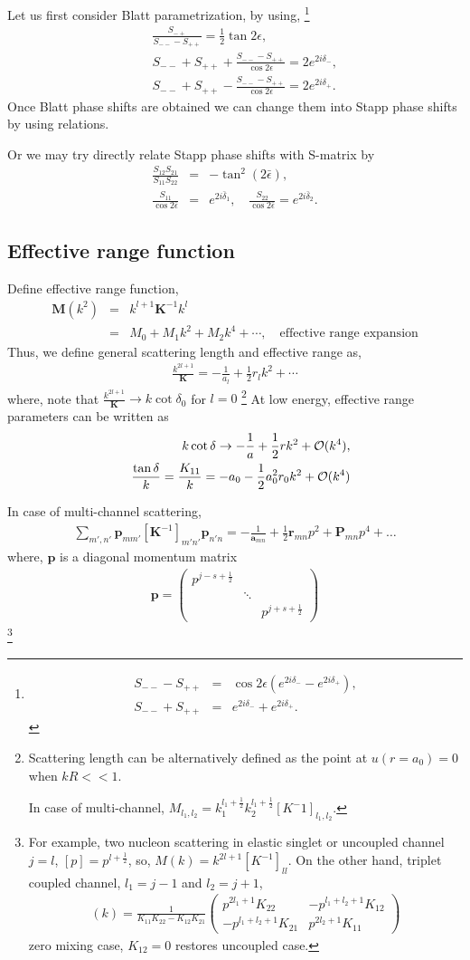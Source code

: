 \documentclass[10pt]{book}
\def\bm{\boldsymbol}
\newcommand{\bea}{\begin{eqnarray}}
\newcommand{\eea}{\end{eqnarray}}
\newcommand{\no}{\nonumber \\}
\def\vp{{\bm p}}
\begin{document}
Let us first consider Blatt parametrization,
 by using, \footnote{  
\bea 
S_{--}-S_{++}&=&\cos 2\epsilon (e^{2i\delta_{-}}-e^{2i\delta_{+}}),\no  
S_{--}+S_{++}&=& e^{2i\delta_{-}}+e^{2i\delta_{+}}.
\eea 
}
\bea 
& &\frac{S_{-+}}{S_{--}-S_{++}}=\frac{1}{2}\tan 2\epsilon,\no 
& & S_{--}+S_{++}+\frac{S_{--}-S_{++}}{\cos 2\epsilon}=2e^{2i\delta_{-}},\no 
& & S_{--}+S_{++}-\frac{S_{--}-S_{++}}{\cos 2\epsilon}=2e^{2i\delta_{+}}.
\eea  
Once Blatt phase shifts are obtained we can change them into Stapp phase shifts
by using relations. 

Or we may try directly relate Stapp phase shifts with S-matrix by 
\bea 
\frac{S_{12}S_{21}}{S_{11}S_{22}}&=& -\tan^2(2\bar{\epsilon}), \no 
\frac{S_{11}}{\cos 2\bar{\epsilon}}&=& e^{2i\bar{\delta}_1},\quad 
\frac{S_{22}}{\cos 2\bar{\epsilon}}= e^{2i\bar{\delta}_2}.
\eea 

\subsection{Effective range function}
Define effective range function,
\bea
{\bm M}(k^2)&=&k^{l+1}{\bm K}^{-1} k^{l} \no
  &=& M_0+M_1 k^2+M_2 k^4+\cdots,\quad\mbox{effective range expansion}
\eea
Thus, we define general scattering length and effective range as,
\bea
\frac{k^{2l+1}}{\bm K}=-\frac{1}{a_l}+\frac{1}{2}r_l k^2+\cdots
\eea
where, note that $\frac{k^{2l+1}}{\bm K}\to k\cot\delta_0$ for $l=0$
\footnote{ Scattering length can be alternatively defined as the point at $u(r=a_0)=0$ when $kR<<1$.

In case of multi-channel, $M_{l_1,l_2}=k_1^{l_1+\frac{1}{2}}k_2^{l_1+\frac{1}{2}}[K^-1]_{l_1,l_2}$.
}
At low energy, effective range parameters 
can be written as
\bea
& &k\cot\delta\to -\frac{1}{a}+\frac{1}{2} r k^2+{\cal O}(k^4),\no
& &\frac{\tan\delta}{k}=\frac{K_{11}}{k}
  =-a_0-\frac{1}{2} a_0^2 r_0 k^2+{\cal O}(k^4)
\eea

In case of multi-channel scattering,
\bea 
\sum_{m',n'} \vp_{mm'}[{\bm K}^{-1}]_{m'n'}\vp_{n'n}
 =-\frac{1}{{\bm a}_{mn}}+\frac{1}{2}{\bm r}_{mn}p^2+{\bm P}_{mn}p^4+\dots
\eea 
where, ${\bm p}$ is a diagonal momentum matrix
\bea 
{\bm p}=\left(\begin{array}{ccc} p^{j-s+\frac{1}{2}} &  & \\  &\ddots   &   \\
                           &  & p^{j+s+\frac{1}{2}}  \end{array}\right) 
\eea 
\footnote{ 
For example, two nucleon scattering in elastic singlet or uncoupled channel $j=l$,
$[p]=p^{l+\frac{1}{2}}$, so, $M(k)=k^{2l+1} [K^{-1}]_{ll}$. 
On the other hand, triplet coupled channel, $l_1=j-1$ and $l_2=j+1$, 
\bea 
[M](k)=\frac{1}{K_{11}K_{22}-K_{12}K_{21}}
\left(\begin{array}{cc} 
    p^{2l_1+1} K_{22} & -p^{l_1+l_2+1} K_{12}  \\
    -p^{l_1+l_2+1} K_{21} & p^{2l_2+1} K_{11}  \end{array}\right)
\eea 
zero mixing case, $K_{12}=0$ restores uncoupled case.
}
\end{document}
